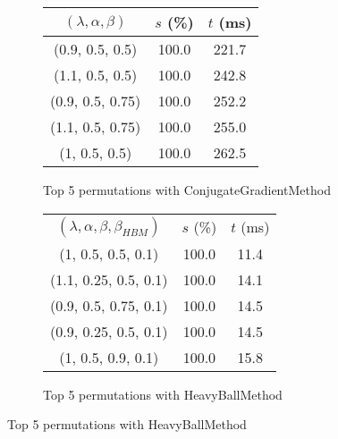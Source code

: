 \begin{figure}[H]
{\begin{subfigure}[ht]{.6\textwidth}
\begin{tabular}{|c|c|c|}
\hline
\rowcolor{gray!25}
$(\lambda,\alpha,\beta)$ & $s$ (\%) & $t$ (ms) \\
\hline
(0.9, 0.5, 0.5) & 100.0 & 221.7 \\
(1.1, 0.5, 0.5) & 100.0 & 242.8 \\
(0.9, 0.5, 0.75) & 100.0 & 252.2 \\
(1.1, 0.5, 0.75) & 100.0 & 255.0 \\
(1, 0.5, 0.5) & 100.0 & 262.5 \\
\hline
\end{tabular}
\caption{Top 5 permutations with ConjugateGradientMethod}
\label{subfig:param_comp_NegativeEntropy_ConjugateGradientMethod_ArmijoSearch}
\end{subfigure}
\hfill
\begin{subfigure}[ht]{.6\textwidth}
\centering
{}
\begin{tabular}{|c|c|c|}
\hline
\rowcolor{gray!25}
\multicolumn{3}{|c|}{HeavyBallMethod} \\
\hline
\rowcolor{gray!25}
$(\lambda,\alpha,\beta,\beta_{HBM})$ & $s$ (\%) & $t$ (ms) \\
\hline
(1, 0.5, 0.5, 0.1) & 100.0 & 11.4 \\
(1.1, 0.25, 0.5, 0.1) & 100.0 & 14.1 \\
(0.9, 0.5, 0.75, 0.1) & 100.0 & 14.5 \\
(0.9, 0.25, 0.5, 0.1) & 100.0 & 14.5 \\
(1, 0.5, 0.9, 0.1) & 100.0 & 15.8 \\
\hline
\end{tabular}
\caption{Top 5 permutations with HeavyBallMethod}
\label{subfig:param_comp_NegativeEntropy_HeavyBallMethod_ArmijoSearch}
\end{subfigure}
}
\end{figure}